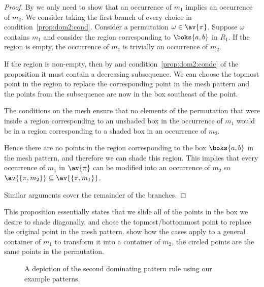 \begin{proof}
    By  we only need to show that an occurrence of \(m_1\)
    implies an occurrence of \(m_2\).
    We consider taking the first branch of every choice in condition~\eqref{prop:dom2:cond}.
    Consider a permutation \(\omega \in \av{\pi}\). Suppose
    \(\omega\) contains \(m_1\) and consider the region corresponding to
    \(\boks{a,b}\) in \(R_1\). If the region is empty, the occurrence of \(m_1\) is trivially an occurrence
    of \(m_2\).

    If the region is non-empty, then by  and
    condition~\eqref{prop:dom2:condc} of the proposition it must contain
    a decreasing subsequence.
    We can choose the topmost point in the region to replace the corresponding
    point in the mesh pattern and the points from the subsequence are now in
    the box southeast of the point.

    The conditions on the mesh ensure that no elements of the permutation
    that were inside a region corresponding to an unshaded box in the occurrence
    of \(m_1\) would be in a region corresponding to a shaded box in an occurrence of
    \(m_2\).

    Hence there are no
    points in the region corresponding to the box \(\boks{a,b}\) in the mesh
    pattern, and therefore we can shade this region. This implies that every
    occurrence of \(m_1\) in \(\av{\pi}\) can be modified into an occurrence of \(m_2\)
    so \(\av{\{\pi,m_2\}} \subseteq \av{\{\pi,m_1\}}\).

    Similar arguments cover the remainder of the branches.
\end{proof}

This proposition essentially states that we slide all of the points in the box we desire
to shade diagonally, and chose the topmost/bottommost point to replace the original
point in the mesh pattern.  show how the cases apply to a general container of \(m_1\) to transform it into a container of \(m_2\), the circled points are the same points in the permutation.
\begin{figure}
\raisebox{8ex}{\(\coinc{}\)}
\caption{A depiction of the second dominating pattern rule using our example patterns.}
\label{fig:d2}
\end{figure}

